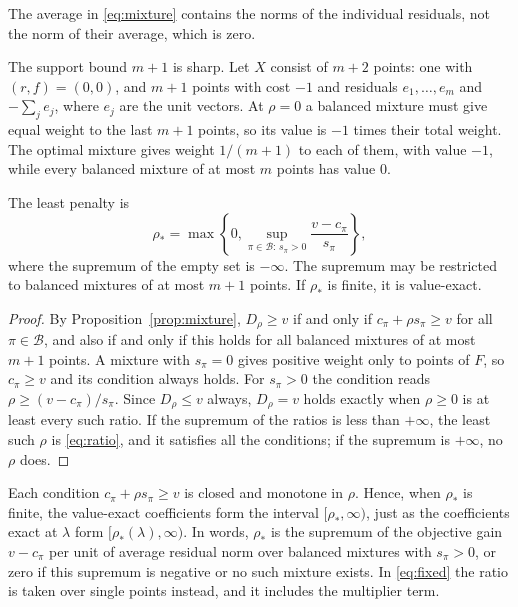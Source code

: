 The average in \eqref{eq:mixture} contains the norms of the individual
residuals, not the norm of their average, which is zero.

The support bound $m+1$ is sharp. Let $X$ consist of $m+2$ points: one
with $(r,f)=(0,0)$, and $m+1$ points with cost $-1$ and residuals
$e_1,\ldots,e_m$ and $-\sum_je_j$, where $e_j$ are the unit vectors.
At $\rho=0$ a balanced mixture must give equal weight to the last $m+1$
points, so its value is $-1$ times their total weight. The optimal
mixture gives weight $1/(m+1)$ to each of them, with value $-1$, while
every balanced mixture of at most $m$ points has value $0$.

\begin{corollary}\label{cor:ratio}
The least penalty is
\begin{equation}\label{eq:ratio}
 \rho_*=\max\left\{0,\sup_{\pi\in\mathcal B:\,s_\pi>0}
                  \frac{v-c_\pi}{s_\pi}\right\},
\end{equation}
where the supremum of the empty set is $-\infty$. The supremum may be
restricted to balanced mixtures of at most $m+1$ points. If $\rho_*$ is
finite, it is value-exact.
\end{corollary}
\begin{proof}
By Proposition~\ref{prop:mixture}, $D_\rho\ge v$ if and only if
$c_\pi+\rho s_\pi\ge v$ for all $\pi\in\mathcal B$, and also if and only
if this holds for all balanced mixtures of at most $m+1$ points. A
mixture with $s_\pi=0$ gives positive weight only to points of $F$, so
$c_\pi\ge v$ and its condition always holds. For $s_\pi>0$ the condition
reads $\rho\ge(v-c_\pi)/s_\pi$. Since $D_\rho\le v$ always, $D_\rho=v$
holds exactly when $\rho\ge0$ is at least every such ratio. If the
supremum of the ratios is less than $+\infty$, the least such $\rho$ is
\eqref{eq:ratio}, and it satisfies all the conditions; if the supremum
is $+\infty$, no $\rho$ does.
\end{proof}
Each condition $c_\pi+\rho s_\pi\ge v$ is closed and monotone in $\rho$.
Hence, when $\rho_*$ is finite, the value-exact coefficients form the
interval $[\rho_*,\infty)$, just as the coefficients exact at $\lambda$
form $[\rho_*(\lambda),\infty)$. In words, $\rho_*$ is the supremum of the objective gain $v-c_\pi$ per
unit of average residual norm over balanced mixtures with $s_\pi>0$, or
zero if this supremum is negative or no such mixture exists. In \eqref{eq:fixed} the ratio is taken over
single points instead, and it includes the multiplier term.

